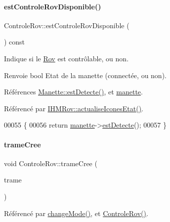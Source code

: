 \paragraph{\texorpdfstring{est\+Controle\+Rov\+Disponible()}{estControleRovDisponible()}}
{\footnotesize\ttfamily Controle\+Rov\+::est\+Controle\+Rov\+Disponible (\begin{DoxyParamCaption}{ }\end{DoxyParamCaption}) const}

Indique si le \hyperlink{class_rov}{Rov} est contrôlable, ou non.

\begin{DoxyReturn}{Renvoie}
bool Etat de la manette (connectée, ou non). 
\end{DoxyReturn}


Références \hyperlink{class_manette_a035c0a43a11e91889891b3c874f0a58d}{Manette\+::est\+Detecte()}, et \hyperlink{class_controle_rov_af5caffd78d06f90d045b53ee87ad76df}{manette}.



Référencé par \hyperlink{class_i_h_m_rov_abbfcdc154a6ae7f941d186f6c90a5a2b}{I\+H\+M\+Rov\+::actualise\+Icones\+Etat()}.


\begin{DoxyCode}
00055 \{
00056     \textcolor{keywordflow}{return} \hyperlink{class_controle_rov_af5caffd78d06f90d045b53ee87ad76df}{manette}->\hyperlink{class_manette_a035c0a43a11e91889891b3c874f0a58d}{estDetecte}();
00057 \}
\end{DoxyCode}
\mbox{\label{class_controle_rov_a05506e1d8caf632b0394dcffd365c06f}} 
\paragraph{\texorpdfstring{trame\+Cree}{trameCree}}
{\footnotesize\ttfamily void Controle\+Rov\+::trame\+Cree (\begin{DoxyParamCaption}\item[{Q\+String}]{trame }\end{DoxyParamCaption})\hspace{0.3cm}{\ttfamily [signal]}}



Référencé par \hyperlink{class_controle_rov_a206d52adf49b8510316b2885ea6b98b0}{change\+Mode()}, et \hyperlink{class_controle_rov_acc4d5fea26770217df978d43df2ad51e}{Controle\+Rov()}.



